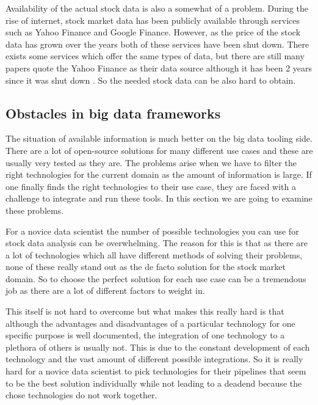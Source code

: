 Availability of the actual stock data is also a somewhat of a problem.
During the rise of internet, stock market data has been publicly available through services such as Yahoo Finance and Google Finance.
However, as the price of the stock data has grown over the years both of these services have been shut down. \cite{lotter}
There exists some services which offer the same types of data, but there are still many papers quote the Yahoo Finance as their data source although it has been 2 years since it was shut down \cite{serez2} \cite{le}.
So the needed stock data can be also hard to obtain.

\subsection{Obstacles in big data frameworks}

The situation of available information is much better on the big data tooling side.
There are a lot of open-source solutions for many different use cases and these are usually very tested as they are.
The problems arise when we have to filter the right technologies for the current domain as the amount of information is large.
If one finally finds the right technologies to their use case, they are faced with a challenge to integrate and run these tools. 
In this section we are going to examine these problems.

For a novice data scientist the number of possible technologies you can use for stock data analysis can be overwhelming.
The reason for this is that as there are a lot of technologies which all have different methods of solving their problems, none of these really stand out as the de facto solution for the stock market domain.
So to choose the perfect solution for each use case can be a tremendous job as there are a lot of different factors to weight in.

This itself is not hard to overcome but what makes this really hard is that although the advantages and disadvantages of a particular technology for one specific purpose is well documented, the integration of one technology to a plethora of others is usually not.
This is due to the constant development of each technology and the vast amount of different possible integrations.
So it is really hard for a novice data scientist to pick technologies for their pipelines that seem to be the best solution individually while not leading to a deadend because the chose technologies do not work together.

